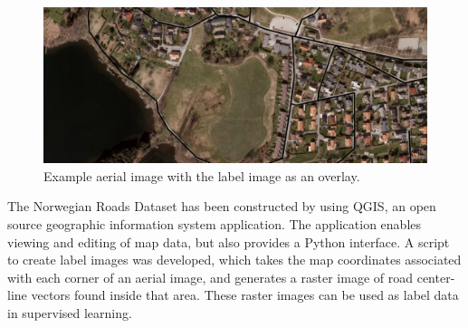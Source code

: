 \begin{figure}[t]
\begin{center}
\includegraphics[width=1\columnwidth]{figs/norwegian_dataset.png}
\caption[Norwegian road dataset example]{Example aerial image with the label image as an overlay.}
\label{fig:aerialimage_norwegian}
\end{center}
\end{figure}

The Norwegian Roads Dataset has been constructed by using QGIS, an open source geographic information system application. The application enables viewing and editing of map data, but also provides a Python interface. A script to create label images was developed, which takes the map coordinates associated with each corner of an aerial image, and generates a raster image of road center-line vectors found inside that area. These raster images can be used as label data in supervised learning. \\